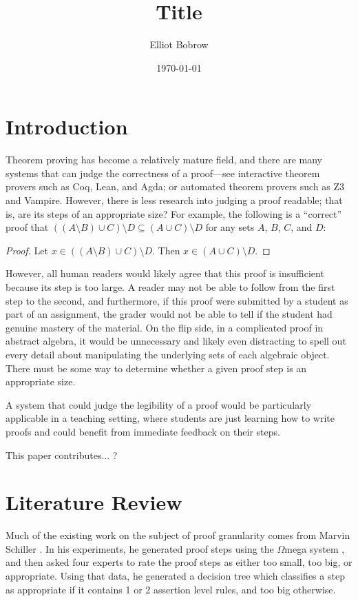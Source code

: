 \documentclass[12pt]{article}
\title{Title}
\author{Elliot Bobrow}
\date{\today}
\begin{document}
\maketitle

\section{Introduction}
Theorem proving has become a relatively mature field, and there are many systems
that can judge the correctness of a proof---see interactive theorem provers such
as Coq, Lean, and Agda; or automated theorem provers such as Z3 and Vampire.
However, there is less research into judging a proof readable; that is, are its
steps of an appropriate size? For example, the following is a ``correct'' proof
that $((A\setminus B)\cup C)\setminus D\subseteq (A\cup C)\setminus D$ for any
sets $A$, $B$, $C$, and $D$:
\begin{proof}
    Let $x\in ((A\setminus B)\cup C)\setminus D$. Then $x\in (A\cup C)\setminus
    D$.
\end{proof}
However, all human readers would likely agree that this proof is insufficient
because its step is too large. A reader may not be able to follow from the first
step to the second, and furthermore, if this proof were submitted by a student
as part of an assignment, the grader would not be able to tell if the student
had genuine mastery of the material.
On the flip side, in a complicated proof in abstract algebra, it would be
unnecessary and likely even distracting to spell out every detail about
manipulating the underlying sets of each algebraic object.
There must be some way to determine whether a given proof step is an appropriate
size.

A system that could judge the legibility of a proof would be particularly
applicable in a teaching setting, where students are just learning how to write
proofs and could benefit from immediate feedback on their steps.

This paper contributes... ?

\section{Literature Review}
Much of the existing work on the subject of proof granularity comes from Marvin
Schiller \cite{Schiller2011,schillerthesis}. In his experiments, he generated
proof steps using the $\Omega$mega system \cite{omega}, and then asked four
experts to rate the proof steps as either too small, too big, or appropriate.
Using that data, he generated a decision tree which classifies a step as
appropriate if it contains 1 or 2 assertion level rules, and too big otherwise.
\end{document}
